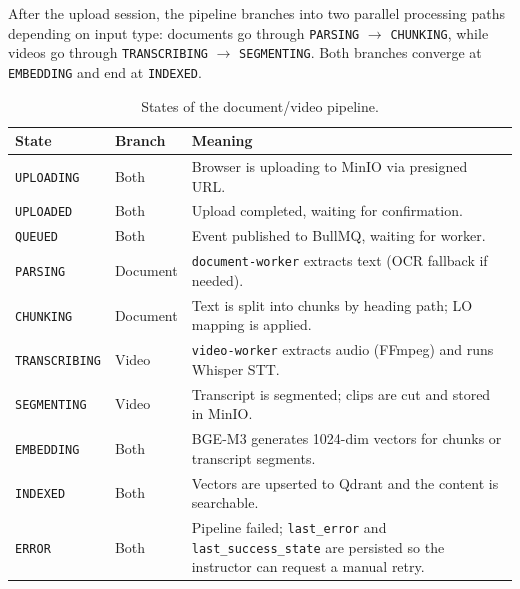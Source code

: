 After the upload session, the pipeline branches into two parallel
processing paths depending on input type: documents go through
\texttt{PARSING} $\to$ \texttt{CHUNKING}, while videos go through
\texttt{TRANSCRIBING} $\to$ \texttt{SEGMENTING}. Both branches converge
at \texttt{EMBEDDING} and end at \texttt{INDEXED}.

\begin{table}[H]
    \centering
    \caption{States of the document/video pipeline.}
    \label{tab:doc-states}
    \begin{tabular}{|p{3.6cm}|p{2cm}|p{7.5cm}|}
        \hline
        \textbf{State} & \textbf{Branch} & \textbf{Meaning} \\
        \hline
        \texttt{UPLOADING}
            & Both
            & Browser is uploading to MinIO via presigned URL. \\
        \hline
        \texttt{UPLOADED}
            & Both
            & Upload completed, waiting for confirmation. \\
        \hline
        \texttt{QUEUED}
            & Both
            & Event published to BullMQ, waiting for worker. \\
        \hline
        \texttt{PARSING}
            & Document
            & \texttt{document-worker} extracts text (OCR fallback if
              needed). \\
        \hline
        \texttt{CHUNKING}
            & Document
            & Text is split into chunks by heading path; LO mapping is
              applied. \\
        \hline
        \texttt{TRANSCRIBING}
            & Video
            & \texttt{video-worker} extracts audio (FFmpeg) and runs
              Whisper STT. \\
        \hline
        \texttt{SEGMENTING}
            & Video
            & Transcript is segmented; clips are cut and stored in
              MinIO. \\
        \hline
        \texttt{EMBEDDING}
            & Both
            & BGE-M3 generates 1024-dim vectors for chunks or transcript
              segments. \\
        \hline
        \texttt{INDEXED}
            & Both
            & Vectors are upserted to Qdrant and the content is
              searchable. \\
        \hline
        \texttt{ERROR}
            & Both
            & Pipeline failed; \texttt{last\_error} and
              \texttt{last\_success\_state} are persisted so the
              instructor can request a manual retry. \\
        \hline
    \end{tabular}
\end{table}

